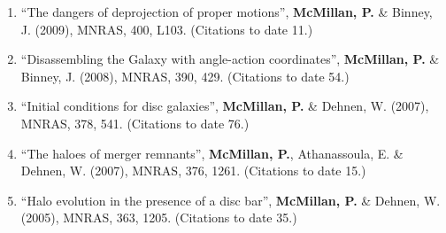 \documentclass{resume}
\begin{document}
\begin{enumerate}
\item ``The dangers of deprojection of proper motions'', \textbf{McMillan, P.} \& Binney, J. (2009), MNRAS, 400, L103. (Citations to date 11.)

\item ``Disassembling the Galaxy with angle-action coordinates'', \textbf{McMillan, P.} \& Binney, J. (2008), MNRAS, 390, 429. (Citations to date 54.)

\item ``Initial conditions for disc galaxies'', \textbf{McMillan, P.} \& Dehnen, W. (2007), MNRAS, 378, 541. (Citations to date 76.)

\item ``The haloes of merger remnants'', \textbf{McMillan, P.}, Athanassoula, E. \& Dehnen, W. (2007), MNRAS, 376, 1261. (Citations to date 15.)

\item ``Halo evolution in the presence of a disc bar'', \textbf{McMillan, P.} \& Dehnen, W. (2005), MNRAS, 363, 1205. (Citations to date 35.)

\end{enumerate}
\end{document}
